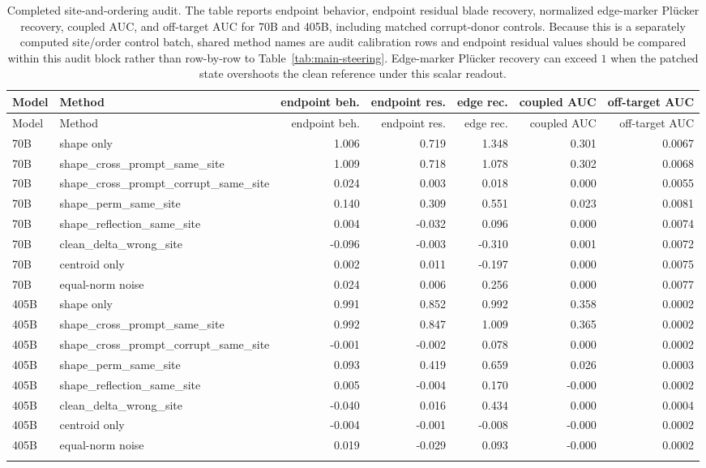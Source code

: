 \documentclass[11pt]{article}
\begin{document}
\begingroup
\scriptsize
\setlength{\tabcolsep}{2.8pt}
\renewcommand{\arraystretch}{0.92}
\begin{longtable}{@{}lp{}rrrrr@{}}
\toprule
Model & Method & endpoint beh. & endpoint res. & edge rec. & coupled AUC & off-target AUC \\
\midrule
\endfirsthead
\toprule
Model & Method & endpoint beh. & endpoint res. & edge rec. & coupled AUC & off-target AUC \\
\midrule
\endhead
70B & shape only & 1.006 & 0.719 & 1.348 & 0.301 & 0.0067 \\
70B & shape\_cross\_prompt\_same\_site & 1.009 & 0.718 & 1.078 & 0.302 & 0.0068 \\
70B & shape\_cross\_prompt\_corrupt\_same\_site & 0.024 & 0.003 & 0.018 & 0.000 & 0.0055 \\
70B & shape\_perm\_same\_site & 0.140 & 0.309 & 0.551 & 0.023 & 0.0081 \\
70B & shape\_reflection\_same\_site & 0.004 & -0.032 & 0.096 & 0.000 & 0.0074 \\
70B & clean\_delta\_wrong\_site & -0.096 & -0.003 & -0.310 & 0.001 & 0.0072 \\
70B & centroid only & 0.002 & 0.011 & -0.197 & 0.000 & 0.0075 \\
70B & equal-norm noise & 0.024 & 0.006 & 0.256 & 0.000 & 0.0077 \\
\midrule
405B & shape only & 0.991 & 0.852 & 0.992 & 0.358 & 0.0002 \\
405B & shape\_cross\_prompt\_same\_site & 0.992 & 0.847 & 1.009 & 0.365 & 0.0002 \\
405B & shape\_cross\_prompt\_corrupt\_same\_site & -0.001 & -0.002 & 0.078 & 0.000 & 0.0002 \\
405B & shape\_perm\_same\_site & 0.093 & 0.419 & 0.659 & 0.026 & 0.0003 \\
405B & shape\_reflection\_same\_site & 0.005 & -0.004 & 0.170 & -0.000 & 0.0002 \\
405B & clean\_delta\_wrong\_site & -0.040 & 0.016 & 0.434 & 0.000 & 0.0004 \\
405B & centroid only & -0.004 & -0.001 & -0.008 & -0.000 & 0.0002 \\
405B & equal-norm noise & 0.019 & -0.029 & 0.093 & -0.000 & 0.0002 \\
\bottomrule
\caption{Completed site-and-ordering audit. The table reports endpoint behavior, endpoint residual blade recovery, normalized edge-marker Pl\"ucker recovery, coupled AUC, and off-target AUC for 70B and 405B, including matched corrupt-donor controls. Because this is a separately computed site/order control batch, shared method names are audit calibration rows and endpoint residual values should be compared within this audit block rather than row-by-row to Table~\ref{tab:main-steering}. Edge-marker Pl\"ucker recovery can exceed \(1\) when the patched state overshoots the clean reference under this scalar readout.}
\label{tab:site-order-appendix}
\end{longtable}
\endgroup
\end{document}
